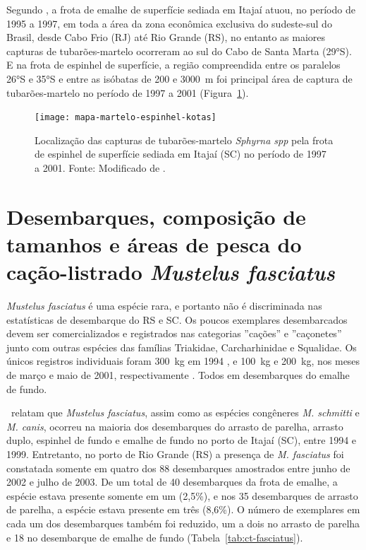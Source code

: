 \documentclass[a4paper,11pt,twoside,showtrims,onecolumn,openright,final]{memoir}
\begin{document}
Segundo \citet{kotas2004}, a frota de emalhe de superfície sediada em Itajaí
atuou, no período de 1995 a 1997, em toda a área da zona econômica exclusiva do sudeste-sul 
do Brasil, desde Cabo Frio (RJ) até Rio Grande (RS), no entanto as maiores capturas de 
tubarões-martelo ocorreram ao sul do Cabo de Santa Marta (29°S). E na frota de espinhel 
de superfície, a região compreendida entre os 
paralelos 26°S e 35°S e entre as isóbatas de 200 e 3000~m foi principal área de 
captura de tubarões-martelo no período de 1997 a 2001 (Figura~\ref{fig:mapakotas-martelo}).

%
%

\begin{figure}
\begin{center}
\texttt{[image: mapa-martelo-espinhel-kotas]}
\end{center}
\caption[Localização das capturas de tubarões-martelo \emph{Sphyrna spp} pela frota de espinhel de superfície 
         sediada em Itajaí (SC) no período de 1997 a 2001]
        {Localização das capturas de tubarões-martelo \emph{Sphyrna spp} pela frota de espinhel de superfície 
         sediada em Itajaí (SC) no período de 1997 a 2001. Fonte: Modificado de \citet{kotas2004}.}
\label{fig:mapakotas-martelo}
\end{figure}


\section*{Desembarques, composição de tamanhos e áreas de pesca do cação-listrado \emph{Mustelus fasciatus}}

\emph{Mustelus fasciatus} é uma espécie rara, e portanto não é discriminada nas estatísticas 
de desembarque do RS e SC.  Os poucos exemplares desembarcados devem ser comercializados 
e registrados nas categorias  ''cações'' e ''caçonetes'' junto com outras espécies das 
famílias Triakidae, Carcharhinidae e Squalidae. Os únicos registros individuais 
foram 300~kg em 1994  \citep{branco1997}, e 100~kg e 200~kg, nos meses de março e maio de 2001, 
respectivamente \citep{univali2002}. Todos em desembarques do emalhe de fundo.

\citet{mazzoleni1999}\ relatam que \emph{Mustelus fasciatus}, assim como as espécies 
congêneres \emph{M. schmitti} e \emph{M. canis}, ocorreu na maioria dos desembarques do arrasto de parelha, 
arrasto duplo, espinhel de fundo e emalhe de fundo no porto de Itajaí (SC), entre 1994 e 1999. 
Entretanto, no porto de Rio Grande (RS) a presença de \emph{M. fasciatus} foi constatada somente em 
quatro dos 88 desembarques amostrados entre junho de 2002 e julho de 2003. De um total 
de 40 desembarques da frota de emalhe, a espécie estava presente somente em um (2,5\%), 
e nos 35 desembarques de arrasto de parelha, a espécie estava presente em três (8,6\%). 
O número de exemplares em cada um dos desembarques também foi reduzido, um a dois no arrasto 
de parelha e 18 no desembarque de emalhe de fundo (Tabela~\ref{tab:ct-fasciatus}).
\end{document}
